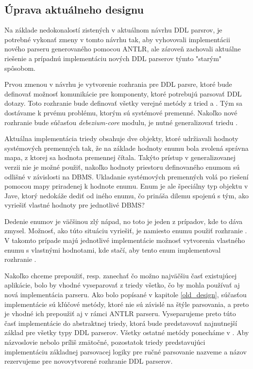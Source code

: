 \subsection{Úprava aktuálneho designu}
Na základe nedokonalostí zistených v aktuálnom návrhu DDL parsrov, je potrebné vykonať zmeny v tomto návrhu tak, aby vyhovovali implementácii nového parseru generovaného pomocou ANTLR, ale zároveň zachovali aktuálne riešenie a prípadnú implementáciu nových DDL parserov týmto "starým"{ }spôsobom.

Prvou zmenou v návrhu je vytvorenie rozhrania pre DDL parsre, ktoré bude definovať možnosť komunikácie pre komponenty, ktoré potrebujú parsovať DDL dotazy. Toto rozhranie bude definovať všetky verejné metódy z tried  a . Tým sa dostávame k prvému problému, ktorým sú systémové premenné. Nakoľko nové rozhranie bude súčasťou \textit{debezium-core} modulu, je nutné generalizovať triedu . 

Aktuálna implementácia triedy  obsahuje dve  objekty, ktoré udržiavali hodnoty systémových premenných tak, že na základe hodnoty enumu  bola zvolená správna mapa, z ktorej sa hodnota premennej čítala. Takýto prístup v generalizovanej verzii nie je možné použiť, nakoľko hodnoty priestoru definovaného enumom  sú odlišné v závislosti na DBMS. Ukladanie systémových premenných volá po riešení pomocou mapy priradenej k hodnote  enumu. Enum je ale špeciálny typ objektu v Jave, ktorý nedokáže dediť od iného enumu, čo prináša dilemu spojenú s tým, ako vyriešiť vlastné hodnoty  pre jednotlivé DBMS? 

Dedenie enumov je väčšinou zlý nápad, no toto je jeden z prípadov, kde to dáva zmysel. Možnosť, ako túto situáciu vyriešiť, je namiesto enumu  použiť rozhranie . V takomto prípade majú jednotlivé implementácie možnosť vytvorenia vlastného enumu s vlastnými hodnotami, kde stačí, aby tento enum implementoval rozhranie . \cite{effective_java}

Nakoľko chceme prepoužiť, resp. zanechať čo možno najväčšiu časť existujúcej aplikácie, bolo by vhodné vyseparovať z triedy  všetko, čo by mohla používať aj nová implementácia parseru. Ako bolo popísané v kapitole \ref{old_design}, súčasťou implementácie  sú kľúčové metódy, ktoré nie sú závislé na štýle parsovania, a preto je vhodné ich prepoužiť aj v rámci ANTLR parseru. Vyseparujeme preto túto časť implementácie do abstraktnej triedy, ktorá bude predstavovať najnutnejší základ pre všetky typy DDL parserov. Všetky ostatné metódy ponecháme v . Aby názvoslovie nebolo príliš zmätočné, pozostatok triedy  predstavujúci implementáciu základnej parsovacej logiky pre ručné parsovanie nazveme  a názov  rezervujeme pre novovytvorené rozhranie DDL parserov.

